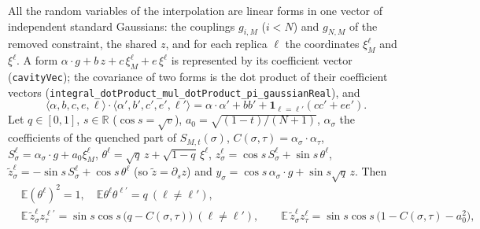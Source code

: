 \begin{lemma}\label{lem:sg-tal:perceptron-cavity-covariance}
  \leanok
All the random variables of the interpolation are linear forms in one vector of independent standard Gaussians: the couplings
$g_{i,M}$ ($i<N$) and $g_{N,M}$ of the removed constraint, the shared $z$, and for each replica $\ell$ the coordinates $\xi_M^\ell$ and $\xi^\ell$.
A form $\alpha\cdot g+b\,z+c\,\xi_M^\ell+e\,\xi^\ell$ is represented by its coefficient vector (\texttt{cavityVec}); the covariance of two forms is the dot product of
their coefficient vectors (\texttt{integral\_dotProduct\_mul\_dotProduct\_pi\_gaussianReal}), and
\[
 \langle\alpha,b,c,e,\ell\rangle\cdot\langle\alpha',b',c',e',\ell'\rangle=\alpha\cdot\alpha'+bb'+\mathbf 1_{\ell=\ell'}(cc'+ee').
\]
Let $q\in[0,1]$, $s\in\mathbb R$ ($\cos s=\sqrt v$), $a_0=\sqrt{(1-t)/(N+1)}$, $\alpha_\sigma$ the coefficients of the quenched part of $S_{M,t}(\sigma)$,
$C(\sigma,\tau)=\alpha_\sigma\cdot\alpha_\tau$, $S^\ell_\sigma=\alpha_\sigma\cdot g+a_0\xi_M^\ell$, $\theta^\ell=\sqrt q\,z+\sqrt{1-q}\,\xi^\ell$,
$z^\ell_\sigma=\cos s\,S^\ell_\sigma+\sin s\,\theta^\ell$, $\tilde z^\ell_\sigma=-\sin s\,S^\ell_\sigma+\cos s\,\theta^\ell$ (so $\tilde z=\partial_sz$) and
$y_\sigma=\cos s\,\alpha_\sigma\cdot g+\sin s\sqrt q\,z$. Then
\begin{align*}
 &\mathbb E(\theta^\ell)^2=1,\quad \mathbb E\theta^\ell\theta^{\ell'}=q\ (\ell\ne\ell'),\\
 &\mathbb E\,\tilde z^\ell_\sigma z^{\ell'}_\tau=\sin s\cos s\,\bigl(q-C(\sigma,\tau)\bigr)\ (\ell\neq\ell'),\qquad
 \mathbb E\,\tilde z^\ell_\sigma z^{\ell}_\tau=\sin s\cos s\,\bigl(1-C(\sigma,\tau)-a_0^2\bigr),\\

\end{align*}
\end{lemma}
